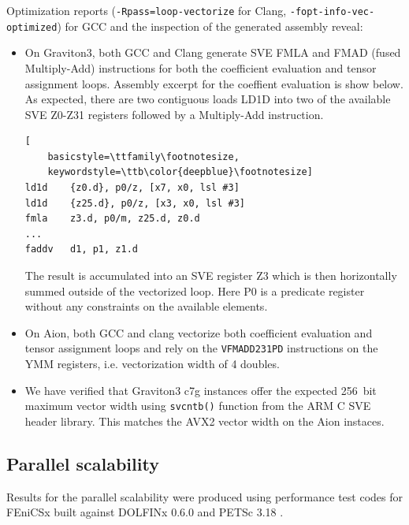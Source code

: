 Optimization reports (\texttt{-Rpass=loop-vectorize} for Clang,
\texttt{-fopt-info-vec-optimized}) for GCC and the inspection of the generated
assembly reveal:
\begin{itemize}
    \item On Graviton3, both GCC and Clang generate SVE FMLA and FMAD (fused
    Multiply-Add) instructions for both the coefficient evaluation and tensor
    assignment loops. Assembly excerpt for the coeffient evaluation is show
    below. As expected, there are two contiguous loads LD1D into two of the
    available SVE Z0-Z31 registers followed by a Multiply-Add instruction.
\begin{lstlisting}[
    basicstyle=\ttfamily\footnotesize,
    keywordstyle=\ttb\color{deepblue}\footnotesize]
ld1d    {z0.d}, p0/z, [x7, x0, lsl #3]
ld1d    {z25.d}, p0/z, [x3, x0, lsl #3]
fmla    z3.d, p0/m, z25.d, z0.d
...
faddv   d1, p1, z1.d
\end{lstlisting}
    The result is accumulated into an SVE register Z3 which is then horizontally
    summed outside of the vectorized loop. Here P0 is a predicate
    register without any constraints on the available elements.
    \item On Aion, both GCC and clang vectorize both coefficient evaluation and
    tensor assignment loops and rely on the \lstinline{VFMADD231PD} instructions
    on the YMM registers, i.e. vectorization width of 4 doubles.
    \item  We have verified that Graviton3 c7g instances offer the expected
    \SI{256}{bit} maximum vector width using \lstinline{svcntb()} function from
    the ARM C SVE header library. This matches the AVX2 vector width on the
    Aion instaces.
\end{itemize}

\subsection*{Parallel scalability}

Results for the parallel scalability were produced using performance test codes
for FEniCSx \cite{Wells2023} built against DOLFINx 0.6.0 and PETSc 3.18
\cite{petsc}.

